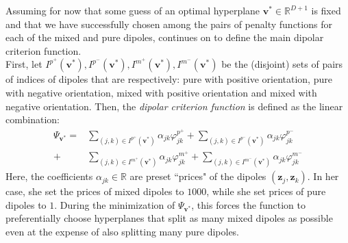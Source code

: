 \documentclass[12pt]{amsart}
\theoremstyle{definition}
\theoremstyle{plain}
\theoremstyle{remark}
\newcommand{\RR}{\mathbb{R}}
\begin{document}
Assuming for now that some guess of an optimal hyperplane $\mathbf{v}^\ast \in \RR^{D + 1}$ is fixed and that we have successfully chosen among the pairs of penalty functions for each of the mixed and pure dipoles, \cite{kretowska} continues on to define the main dipolar criterion function. \\

First, let $I^{p^+}(\mathbf{v}^\ast), I^{p^-}(\mathbf{v}^\ast), I^{m^+}(\mathbf{v}^\ast), I^{m^-}(\mathbf{v}^\ast)$ be the (disjoint) sets of pairs of indices of dipoles that are respectively: pure with positive orientation, pure with negative orientation, mixed with positive orientation and mixed with negative orientation. Then, the  \emph{dipolar criterion function} is defined as the linear combination:
\begin{align*}
	\Psi_{\mathbf{v}^\ast} = &\sum_{(j, k) \in I^{p^+}(\mathbf{v}^\ast)} \alpha_{jk} \varphi^{p^+}_{jk} + \sum_{(j, k) \in I^{p^-}(\mathbf{v}^\ast)} \alpha_{jk} \varphi^{p^-}_{jk} \\ 
	+ &\sum_{(j, k) \in I^{m^+}(\mathbf{v}^\ast)} \alpha_{jk} \varphi^{m^+}_{jk} + \sum_{(j, k) \in I^{m^-}(\mathbf{v}^\ast)} \alpha_{jk} \varphi^{m^-}_{jk}
\end{align*} Here, the coefficients $\alpha_{jk} \in \RR$ are preset ``prices" \cite{kretowska} of the dipoles $(\mathbf{z}_j, \mathbf{z}_k)$. In her case, she set the prices of mixed dipoles to $1000$, while she set prices of pure dipoles to $1$. During the minimization of $\Psi_{\mathbf{v}^\ast}$, this forces the function to preferentially choose hyperplanes that split as many mixed dipoles as possible even at the expense of also splitting many pure  dipoles.







\end{document}
